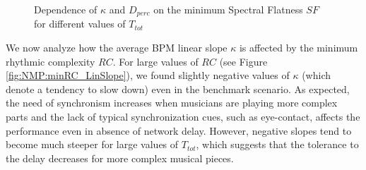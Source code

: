 \begin{figure}[!tb]
\begin{flushright}
    \hfil
\end{flushright}
\caption{Dependence of $\kappa$ and $D_{perc}$ on the minimum Spectral Flatness $SF$ for different values of $T_{tot}$}
\label{fig:NMP:minSF}
\end{figure}

We now analyze how the average BPM linear slope $\kappa$ is affected by the minimum rhythmic complexity $RC$. For large values of $RC$ (see Figure \ref{fig:NMP:minRC_LinSlope}), we found slightly negative values of $\kappa$ (which denote a tendency to slow down) even in the benchmark scenario. As expected, the need of synchronism increases when musicians are playing more complex parts and the lack of typical synchronization cues, such as eye-contact, affects the performance even in absence of network delay. However, negative slopes tend to become much steeper for large values of $T_{tot}$, which suggests that the tolerance to the delay decreases for more complex musical pieces.

